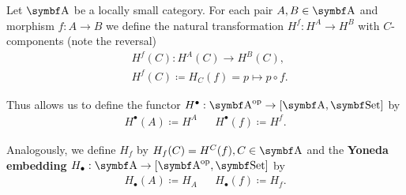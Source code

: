 \begin{definition}\label{def:yoneda_embedding}\cite[definitions 4.1.15, 4.1.21]{Leinster2014}
  Let \( \Bold A \) be a locally small category. For each pair \( A, B \in \Bold A \) and morphism \( f: A \to B \) we define the natural transformation \( H^f: H^A \to H^B \) with \( C \)-components (note the reversal)
  \begin{align*}
    &H^f(C): H^A(C) \to H^B(C), \\
    &H^f(C) \coloneqq H_C(f) = p \mapsto p \circ f.
  \end{align*}

  Thus allows us to define the functor \( H^\bullet: \Bold{A}^{\Op} \to [\Bold{A}, \Bold{Set}] \) by
  \begin{align*}
    H^\bullet(A) \coloneqq H^A && H^\bullet(f) \coloneqq H^f.
  \end{align*}

  Analogously, we define \( H_f \) by \( H_f(C) = H^C(f), C \in \Bold A \) and the \textbf{Yoneda embedding} \( H_\bullet: \Bold{A} \to [\Bold{A}^{\Op}, \Bold{Set}] \) by
  \begin{align*}
    H_\bullet(A) \coloneqq H_A && H_\bullet(f) \coloneqq H_f.
  \end{align*}
\end{definition}

